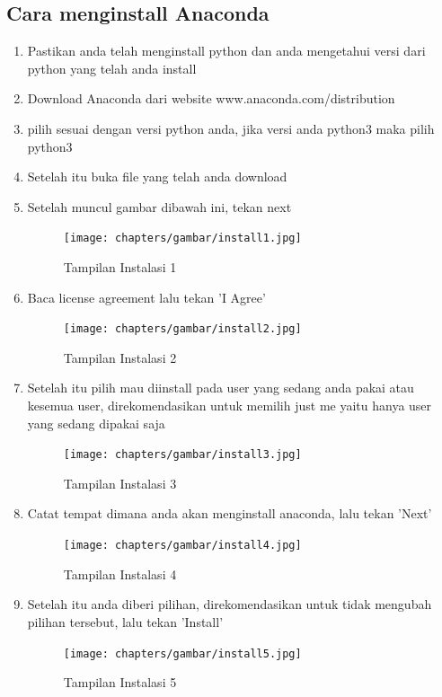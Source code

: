 \subsection{Cara menginstall Anaconda}
\begin{enumerate}
  \item Pastikan anda telah menginstall python dan anda mengetahui versi dari python yang telah anda install
  \item Download Anaconda dari website www.anaconda.com/distribution
  \item pilih sesuai dengan versi python anda, jika versi anda python3 maka pilih python3
  \item Setelah itu buka file yang telah anda download
  \item Setelah muncul gambar dibawah ini, tekan next
\begin{figure}[!htbp]
  \centering
  \texttt{[image: chapters/gambar/install1.jpg]}
  \caption{Tampilan Instalasi 1}
\end{figure}

  \item Baca license agreement lalu tekan 'I Agree'
\begin{figure}[!htbp]
  \centering
  \texttt{[image: chapters/gambar/install2.jpg]}
  \caption{Tampilan Instalasi 2}
\end{figure}

  \item Setelah itu pilih mau diinstall pada user yang sedang anda pakai atau kesemua user, direkomendasikan untuk memilih just me yaitu hanya user yang sedang dipakai saja
\begin{figure}[!htbp]
  \centering
  \texttt{[image: chapters/gambar/install3.jpg]}
  \caption{Tampilan Instalasi 3}
\end{figure}

  \item Catat tempat dimana anda akan menginstall anaconda, lalu tekan 'Next'
\begin{figure}[!htbp]
  \centering
  \texttt{[image: chapters/gambar/install4.jpg]}
  \caption{Tampilan Instalasi 4}
\end{figure}

  \item Setelah itu anda diberi pilihan, direkomendasikan untuk tidak mengubah pilihan tersebut, lalu tekan 'Install'
\begin{figure}[!htbp]
  \centering
  \texttt{[image: chapters/gambar/install5.jpg]}
  \caption{Tampilan Instalasi 5}
\end{figure}


\end{enumerate}
